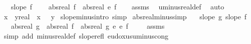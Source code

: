 \begin{isabellebody}
\ \ \ {\isachardoublequoteopen}slope\ f{\isachardoublequoteclose}\isanewline
\ \ \ {\isachardoublequoteopen}{\isacharminus}{\kern0pt}\ abs{\isacharunderscore}{\kern0pt}real\ f\ {\isacharequal}{\kern0pt}\ abs{\isacharunderscore}{\kern0pt}real\ {\isacharparenleft}{\kern0pt}{\isacharminus}{\kern0pt}\isactrlsub e\ f{\isacharparenright}{\kern0pt}{\isachardoublequoteclose}\isanewline
%
\isadelimproof
\ \ %
\endisadelimproof
%
\isatagproof
{}\isamarkupfalse%
\ assms\ \isamarkupfalse%
\ uminus{\isacharunderscore}{\kern0pt}real{\isacharunderscore}{\kern0pt}def\ \isamarkupfalse%
\ auto%
\endisatagproof
{\isafoldproof}%
%
\isadelimproof
\isanewline
%
\endisadelimproof
\isanewline
{}\isamarkupfalse%
\ {\isachardoublequoteopen}x\ {\isacharminus}{\kern0pt}\ {\isacharparenleft}{\kern0pt}y{\isacharcolon}{\kern0pt}{\isacharcolon}{\kern0pt}real{\isacharparenright}{\kern0pt}\ {\isacharequal}{\kern0pt}\ x\ {\isacharplus}{\kern0pt}\ {\isacharminus}{\kern0pt}\ y{\isachardoublequoteclose}\isanewline
\isanewline
{}\isamarkupfalse%
\ slope{\isacharunderscore}{\kern0pt}minus{\isacharbrackleft}{\kern0pt}intro{\isacharcomma}{\kern0pt}\ simp{\isacharbrackright}{\kern0pt}\isanewline
\isanewline
{}\isamarkupfalse%
\ abs{\isacharunderscore}{\kern0pt}real{\isacharunderscore}{\kern0pt}minus{\isacharbrackleft}{\kern0pt}simp{\isacharbrackright}{\kern0pt}{\isacharcolon}{\kern0pt}\isanewline
\ \ \ {\isachardoublequoteopen}slope\ g{\isachardoublequoteclose}\ {\isachardoublequoteopen}slope\ f{\isachardoublequoteclose}\isanewline
\ \ \ {\isachardoublequoteopen}abs{\isacharunderscore}{\kern0pt}real\ g\ {\isacharminus}{\kern0pt}\ abs{\isacharunderscore}{\kern0pt}real\ f\ {\isacharequal}{\kern0pt}\ abs{\isacharunderscore}{\kern0pt}real\ {\isacharparenleft}{\kern0pt}g\ {\isacharplus}{\kern0pt}\isactrlsub e\ {\isacharparenleft}{\kern0pt}{\isacharminus}{\kern0pt}\isactrlsub e\ f{\isacharparenright}{\kern0pt}{\isacharparenright}{\kern0pt}{\isachardoublequoteclose}\ \isanewline
%
\isadelimproof
\ \ %
\endisadelimproof
%
\isatagproof
{}\isamarkupfalse%
\ assms\ \isamarkupfalse%
\ {\isacharparenleft}{\kern0pt}simp\ add{\isacharcolon}{\kern0pt}\ minus{\isacharunderscore}{\kern0pt}real{\isacharunderscore}{\kern0pt}def\ slope{\isacharunderscore}{\kern0pt}refl\ eudoxus{\isacharunderscore}{\kern0pt}uminus{\isacharunderscore}{\kern0pt}cong{\isacharparenright}{\kern0pt}%
\endisatagproof
{\isafoldproof}%

\end{isabellebody}
